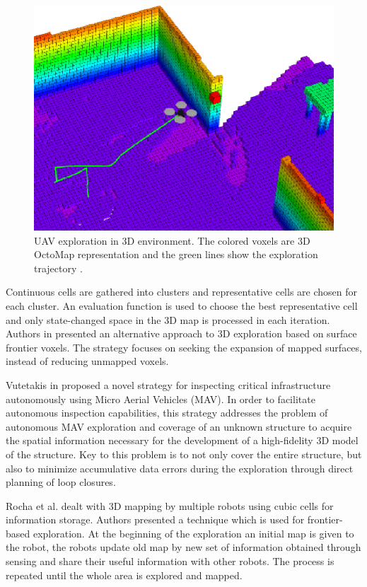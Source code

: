 \begin{figure}[t!]
	\centering
	\includegraphics[width=1.0\columnwidth]{./pictures/octomap_and_drone.png}	
	\caption{UAV exploration in 3D environment. The colored voxels are 3D OctoMap representation and the green lines show the exploration trajectory \cite{Wang2019}.}
	\label{fig:octomap}
\end{figure}

Continuous cells are gathered into clusters and representative cells are chosen for each cluster. An evaluation function is used to choose the best representative cell and only state-changed space in the 3D map is processed in each iteration.
Authors in \cite{Senarathne2016} presented an alternative approach to 3D
exploration based on surface frontier voxels. The strategy focuses on seeking the expansion of mapped surfaces, instead of reducing unmapped voxels. 

Vutetakis in \cite{Vutetakis2019} proposed a novel strategy for inspecting
critical infrastructure autonomously using Micro Aerial Vehicles (MAV). In order to facilitate autonomous inspection capabilities, this strategy addresses the problem of autonomous MAV exploration and coverage of an unknown structure to acquire the spatial information necessary for the development of a high-fidelity 3D model of the structure. Key to this problem is to not only cover the entire structure, but also to minimize accumulative data errors during the exploration through direct planning of loop closures. 

Rocha et al. \cite{Rocha2005} dealt with 3D mapping by multiple robots using cubic cells for information storage. Authors presented a technique which is used for frontier-based exploration. At the beginning of the exploration an initial map is given to the robot, the robots update old map by new set of information obtained through sensing and share their useful information with other robots. The process is repeated until the whole area is explored and mapped.

